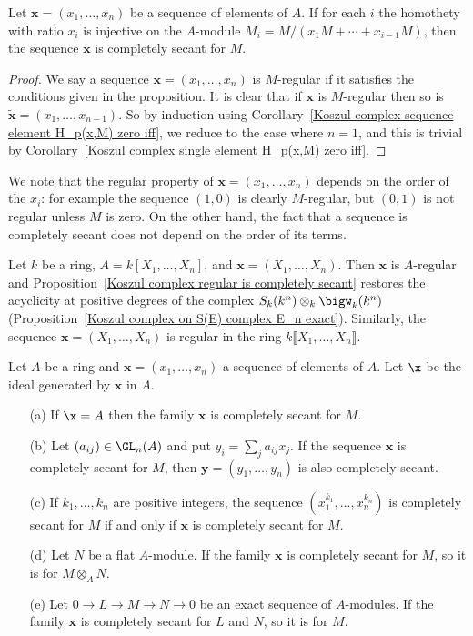 \begin{proposition}\label{Koszul complex regular is completely secant}
Let $\bm{x}=(x_1,\dots,x_n)$ be a sequence of elements of $A$. If for each $i$ the homothety with ratio $x_i$ is injective on the $A$-module $M_i=M/(x_1M+\cdots+x_{i-1}M)$, then the sequence $\bm{x}$ is completely secant for $M$.
\end{proposition}
\begin{proof}
We say a sequence $\bm{x}=(x_1,\dots,x_n)$ is $M$-regular if it satisfies the conditions given in the proposition. It is clear that if $\bm{x}$ is $M$-regular then so is $\tilde{\bm{x}}=(x_1,\dots,x_{n-1})$. So by induction using Corollary~\ref{Koszul complex sequence element H_p(x,M) zero iff}, we reduce to the case where $n=1$, and this is trivial by Corollary~\ref{Koszul complex single element H_p(x,M) zero iff}.
\end{proof}
We note that the regular property of $\bm{x}=(x_1,\dots,x_n)$ depends on the order of the $x_i$: for example the sequence $(1,0)$ is clearly $M$-regular, but $(0,1)$ is not regular unless $M$ is zero. On the other hand, the fact that a sequence is completely secant does not depend on the order of its terms.
\begin{example}
Let $k$ be a ring, $A=k[X_1,\dots,X_n]$, and $\bm{x}=(X_1,\dots,X_n)$. Then $\bm{x}$ is $A$-regular and Proposition~\ref{Koszul complex regular is completely secant} restores the acyclicity at positive degrees of the complex $S_k(k^n)\otimes_k\bigw_k(k^n)$ (Proposition~\ref{Koszul complex on S(E) complex E_n exact}). Similarly, the sequence $\bm{x}=(X_1,\dots,X_n)$ is regular in the ring $k\llbracket X_1,\dots,X_n\rrbracket$.
\end{example}
\begin{proposition}\label{Koszul complex completely secant prop}
Let $A$ be a ring and $\bm{x}=(x_1,\dots,x_n)$ a sequence of elements of $A$. Let $\x$ be the ideal generated by $\bm{x}$ in $A$.
\begin{itemize}
\item[(a)] If $\x=A$ then the family $\bm{x}$ is completely secant for $M$.
\item[(b)] Let $(a_{ij})\in\GL_n(A)$ and put $y_i=\sum_ja_{ij}x_j$. If the sequence $\bm{x}$ is completely secant for $M$, then $\bm{y}=(y_1,\dots,y_n)$ is also completely secant.
\item[(c)] If $k_1,\dots,k_n$ are positive integers, the sequence $(x_1^{k_1},\dots,x_n^{k_n})$ is completely secant for $M$ if and only if $\bm{x}$ is completely secant for $M$.
\item[(d)] Let $N$ be a flat $A$-module. If the family $\bm{x}$ is completely secant for $M$, so it is for $M\otimes_AN$.
\item[(e)] Let $0\to L\to M\to N\to 0$ be an exact sequence of $A$-modules. If the family $\bm{x}$ is completely secant for $L$ and $N$, so it is for $M$.
\end{itemize}
\end{proposition}

